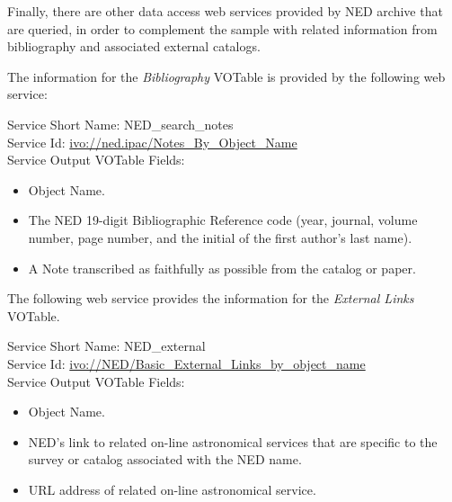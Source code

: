 \documentclass[final,authoryear,5p,times,twocolumn]{elsarticle}
\begin{document}
Finally, there are other data access web services provided by NED archive that are queried, in order to complement the sample with related information from bibliography and associated external catalogs. 

The information for the \textit{Bibliography} VOTable is provided by the following web service:

\begin{minipage}[h]{0.9\columnwidth}
  \small \vspace{\baselineskip}
\noindent Service Short Name: NED\_search\_notes\\
Service Id: \url{ivo://ned.ipac/Notes\_By\_Object\_Name}\\
Service Output VOTable Fields:
\begin{itemize}
\item Object Name.
\item The NED 19-digit Bibliographic Reference code (year, journal, volume number, page number, and the initial of the first author's last name).
\item A Note transcribed as faithfully as possible from the catalog or paper.
\end{itemize}
\vspace{\baselineskip}
\end{minipage}

\begin{samepage}
The following web service provides the information for the \textit{External Links} VOTable.

\begin{minipage}[h]{0.9\columnwidth}
  \small \vspace{\baselineskip}
\noindent Service Short Name: NED\_external\\
Service Id: \url{ivo://NED/Basic\_External\_Links\_by\_object\_name}\\
Service Output VOTable Fields:
\begin{itemize}
\item Object Name.
\item NED's link to related on-line astronomical services that are specific to the survey or catalog associated with the NED name.
\item URL address of related on-line astronomical service.
\end{itemize}
\vspace{\baselineskip}
\end{minipage}
\end{samepage}
\end{document}
